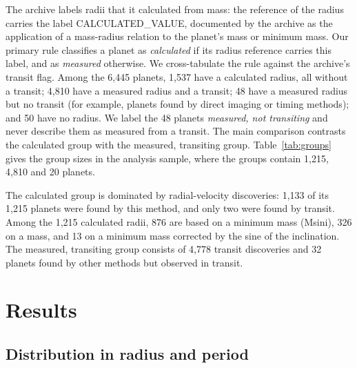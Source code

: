 \documentclass[11pt]{article}
\begin{document}
The archive labels radii that it calculated from mass: the reference of the radius carries the label CALCULATED\_VALUE, documented by the archive as the application of a mass-radius relation to the planet's mass or minimum mass. Our primary rule classifies a planet as \emph{calculated} if its radius reference carries this label, and as \emph{measured} otherwise. We cross-tabulate the rule against the archive's transit flag. Among the 6,445 planets, 1,537 have a calculated radius, all without a transit; 4,810 have a measured radius and a transit; 48 have a measured radius but no transit (for example, planets found by direct imaging or timing methods); and 50 have no radius.
We label the 48 planets \emph{measured, not transiting} and never describe them as measured from a transit. The main comparison contrasts the calculated group with the measured, transiting group. Table~\ref{tab:groups} gives the group sizes in the analysis sample, where the groups contain 1,215, 4,810 and 20 planets.


The calculated group is dominated by radial-velocity discoveries: 1,133 of its 1,215 planets were found by this method, and only two were found by transit. Among the 1,215 calculated radii, 876 are based on a minimum mass (Msini), 326 on a mass, and 13 on a minimum mass corrected by the sine of the inclination.
The measured, transiting group consists of 4,778 transit discoveries and 32 planets found by other methods but observed in transit.

\section{Results}

\subsection{Distribution in radius and period}
\end{document}
